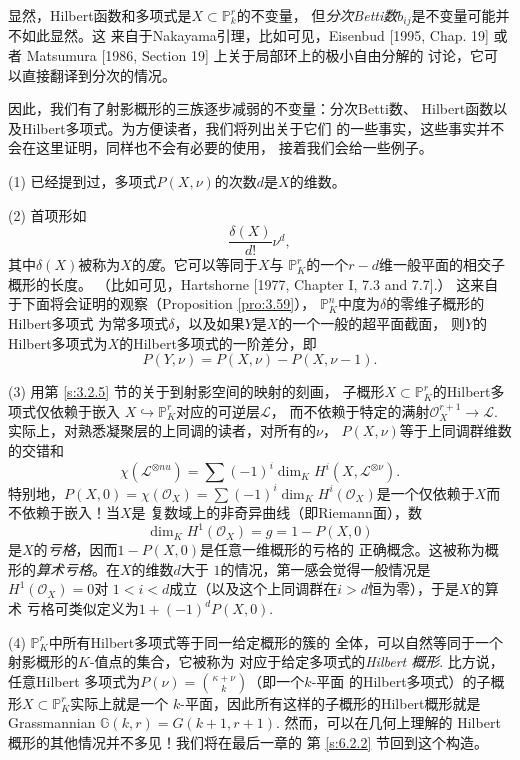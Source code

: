 显然，Hilbert函数和多项式是$X\subset \mathbb P_k^r$的不变量，
但\textit{分次Betti数}$b_{ij}$是不变量可能并不如此显然。这
来自于Nakayama引理，比如可见，Eisenbud [1995, Chap. 19] 或者
Matsumura [1986, Section 19] 上关于局部环上的极小自由分解的
讨论，它可以直接翻译到分次的情况。

因此，我们有了射影概形的三族逐步减弱的不变量：分次Betti数、
Hilbert函数以及Hilbert多项式。为方便读者，我们将列出关于它们
的一些事实，这些事实并不会在这里证明，同样也不会有必要的使用，
接着我们会给一些例子。

(1) 已经提到过，多项式$P(X,\nu)$的次数$d$是$X$的维数。

(2) 首项形如
\[
  \frac{\delta(X)}{d!}\nu^d,
\]
其中$\delta(X)$被称为$X$的\textit{度}。它可以等同于$X$与
$\mathbb P_K^r$的一个$r-d$维一般平面的相交子概形的长度。
（比如可见，Hartshorne [1977, Chapter I, 7.3 and 7.7].）
这来自于下面将会证明的观察（Proposition \ref{pro:3.59}），
$\mathbb P_K^n$中度为$\delta$的零维子概形的Hilbert多项式
为常多项式$\delta$，以及如果$Y$是$X$的一个一般的超平面截面，
则$Y$的Hilbert多项式为$X$的Hilbert多项式的一阶差分，即
\[
  P(Y,\nu)=P(X,\nu)-P(X,\nu-1).
\]

(3) 用第 \ref{s:3.2.5} 节的关于到射影空间的映射的刻画，
子概形$X\subset \mathbb P_K^r$的Hilbert多项式仅依赖于嵌入
$X\hookrightarrow \mathbb P_K^r$对应的可逆层$\mathscr L$，
而不依赖于特定的满射$\mathscr O_X^{r+1}\to \mathscr L$. 
实际上，对熟悉凝聚层的上同调的读者，对所有的$\nu$，
$P(X,\nu)$等于上同调群维数的交错和
\[
  \chi(\mathscr L^{\otimes nu})=\sum (-1)^i \dim_K H^i
  (X,\mathscr L^{\otimes \nu}).
\]
特别地，$P(X,0)=\chi(\mathscr O_X)=\sum (-1)^i \dim_K
H^i(\mathscr O_X)$是一个仅依赖于$X$而不依赖于嵌入！当$X$是
复数域上的非奇异曲线（即Riemann面），数
\[
  \dim_K H^1(\mathscr O_X)=g=1-P(X,0)
\]
是$X$的\textit{亏格}，因而$1-P(X,0)$是任意一维概形的亏格的
正确概念。这被称为概形的\textit{算术亏格}。在$X$的维数$d$大于
$1$的情况，第一感会觉得一般情况是$H^1(\mathscr O_X)=0$对
$1< i < d$成立（以及这个上同调群在$i>d$恒为零），于是$X$的算术
亏格可类似定义为$1+(-1)^d P(X,0)$.

(4) $\mathbb P_K^r$中所有Hilbert多项式等于同一给定概形的簇的
全体，可以自然等同于一个射影概形的$K$-值点的集合，它被称为
对应于给定多项式的\textit{Hilbert 概形}. 比方说，任意Hilbert
多项式为$P(\nu)=\binom{\kappa+\nu}{k}$（即一个$k$-平面
的Hilbert多项式）的子概形$X\subset \mathbb P_K^r$实际上就是一个
$k$-平面，因此所有这样的子概形的Hilbert概形就是Grassmannian%
$\mathbb G(k,r)=G(k+1,r+1)$. 然而，可以在几何上理解的
Hilbert概形的其他情况并不多见！我们将在最后一章的
第 \ref{s:6.2.2} \nottran 节回到这个构造。

